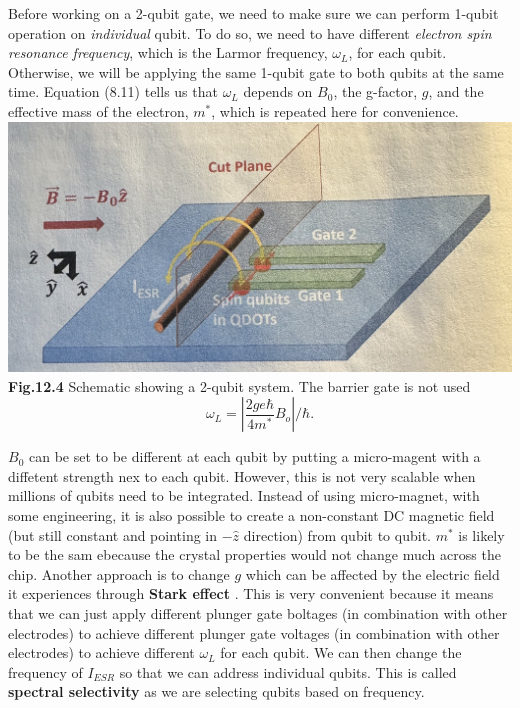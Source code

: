 \documentclass{article}
\begin{document}
Before working on a 2-qubit gate, we need to make sure we can perform 1-qubit operation on \textit{individual} qubit.
To do so, we need to have different \textit{electron spin resonance frequency}, which is the Larmor frequency,
$\omega_L$, for each qubit. Otherwise, we will be applying the same 1-qubit gate to both qubits at the same time.
Equation (8.11) tells us that $\omega_L$ depends on $B_0$, the g-factor, $g$, and the effective mass of the electron, 
$m^*$, which is repeated here for convenience.\\[6pt]

\includegraphics[scale=0.45]{Fig.12.4.jpeg}
\\
\textbf{Fig.12.4} Schematic showing a 2-qubit system. The barrier gate is not used
\\[10pt]
\begin{equation}\label{eq 12.10}
  \omega_L=\left|\frac{2ge\hbar}{4m^*}B_o\right|/\hbar. \tag{12.10}
\end{equation}

$B_0$ can be set to be different at each qubit by putting a micro-magent with a diffetent
strength nex to each qubit. However, this is not very scalable when millions of qubits need to
be integrated. Instead of using micro-magnet, with some engineering, it is also possible to create
a non-constant DC magnetic field (but still constant and pointing in $-\hat{z}$ direction) from
qubit to qubit. $m^*$ is likely to be the sam ebecause the crystal properties would not change
much across the chip. Another approach is to change $g$ which can be affected by the electric field
it experiences through \textbf{Stark effect} \cite{veldhorst2014addressable}. This is very convenient 
because it means that we can just apply different plunger gate boltages (in combination with other electrodes)
to achieve different plunger gate voltages (in combination with other electrodes) to achieve different
$\omega_L$ for each qubit. We can then change the frequency of $I_{ESR}$ so that we can address individual qubits.
This is called \textbf{spectral selectivity} as we are selecting qubits based on frequency.
\end{document}
